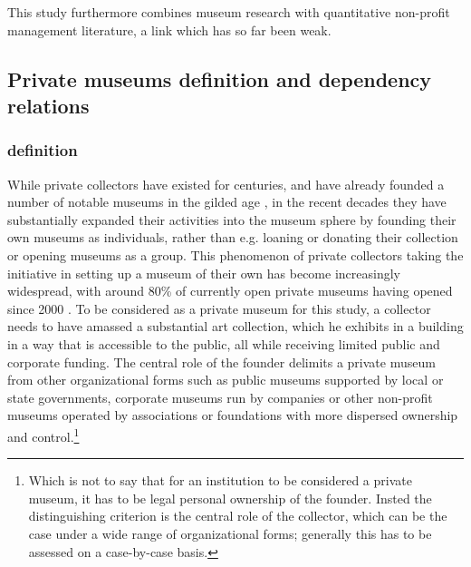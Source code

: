 \documentclass[12pt]{article}
\begin{document}
This study furthermore combines museum research with quantitative non-profit management literature, a link which has so far been weak. 
\subsection*{Private museums definition and dependency relations}



\subsubsection*{definition}


While private collectors have existed for centuries, and have already founded a number of notable museums in the gilded age \parencite{diMaggio_1982_boston,Higonnet_2003_sight,Duncan_1995_civilizing}, in the recent decades they have substantially expanded their activities into the museum sphere by founding their own museums as individuals, rather than e.g. loaning or donating their collection or opening museums as a group.
This phenomenon of private collectors taking the initiative in setting up a museum of their own has become increasingly widespread, with around 80\% of currently open private museums having opened since 2000 \parencite{Velthuis_etal_2023_boom}.
To be considered as a private museum for this study, a collector needs to have amassed a substantial art collection, which he exhibits in a building in a way that is accessible to the public, all while receiving limited public and corporate funding.
The central role of the founder delimits a private museum from other organizational forms such as public museums supported by local or state governments, corporate museums run by companies or other non-profit museums operated by associations or foundations with more dispersed ownership and control.\footnote{Which is not to say that for an institution to be considered a private museum, it has to be legal personal ownership of the founder. Insted the distinguishing criterion is the central role of the collector, which can be the case under a wide range of organizational forms; generally this has to be assessed on a case-by-case basis.}
\end{document}
